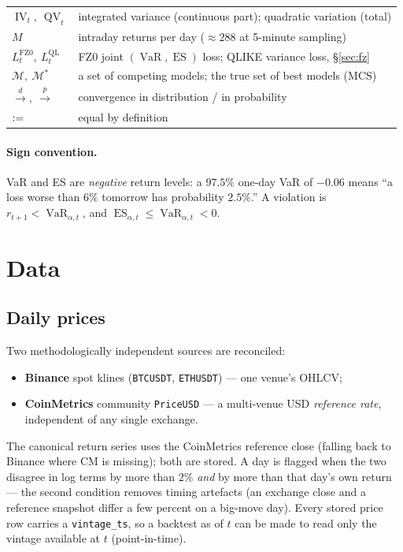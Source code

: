 \documentclass[11pt,a4paper]{article}
\newcommand{\VaR}{\operatorname{VaR}}
\newcommand{\ES}{\operatorname{ES}}
\newcommand{\IV}{\operatorname{IV}}
\newcommand{\QV}{\operatorname{QV}}
\newcommand{\Mcal}{\mathcal{M}}
\newcommand{\eqdef}{\mathrel{\vcentcolon=}}
\newcommand{\dto}{\xrightarrow{d}}
\newcommand{\pto}{\xrightarrow{p}}
\begin{document}
\begin{center}
\begin{tabular}{@{}ll@{}}
$\IV_t,\ \QV_t$          & integrated variance (continuous part); quadratic variation (total) \\
$M$                      & intraday returns per day ($\approx 288$ at 5-minute sampling) \\
$L^{\mathrm{FZ0}}_t,\ L^{\mathrm{QL}}_t$ & FZ0 joint $(\VaR,\ES)$ loss; QLIKE variance loss, \S\ref{sec:fz} \\
$\Mcal,\ \Mcal^\ast$    & a set of competing models; the true set of best models (MCS) \\
$\dto,\ \pto$            & convergence in distribution / in probability \\
$\eqdef$                 & equal by definition \\
\bottomrule
\end{tabular}
\end{center}

\paragraph{Sign convention.} VaR and ES are \emph{negative} return levels: a
$97.5\%$ one-day VaR of $-0.06$ means ``a loss worse than $6\%$ tomorrow has
probability $2.5\%$.'' A violation is $r_{t+1}<\VaR_{\alpha,t}$, and
$\ES_{\alpha,t}\le\VaR_{\alpha,t}<0$.

\section{Data}\label{sec:data}

\subsection{Daily prices}

Two methodologically independent sources are reconciled:
\begin{itemize}[nosep]
\item \textbf{Binance} spot klines (\texttt{BTCUSDT}, \texttt{ETHUSDT}) --- one
      venue's OHLCV;
\item \textbf{CoinMetrics} community \texttt{PriceUSD} --- a multi-venue USD
      \emph{reference rate}, independent of any single exchange.
\end{itemize}
The canonical return series uses the CoinMetrics reference close (falling back
to Binance where CM is missing); both are stored. A day is flagged when the two
disagree in log terms by more than $2\%$ \emph{and} by more than that day's own
return --- the second condition removes timing artefacts (an exchange close and
a reference snapshot differ a few percent on a big-move day). Every stored
price row carries a \texttt{vintage\_ts}, so a backtest as of $t$ can be made to
read only the vintage available at $t$ (point-in-time).
\end{document}
